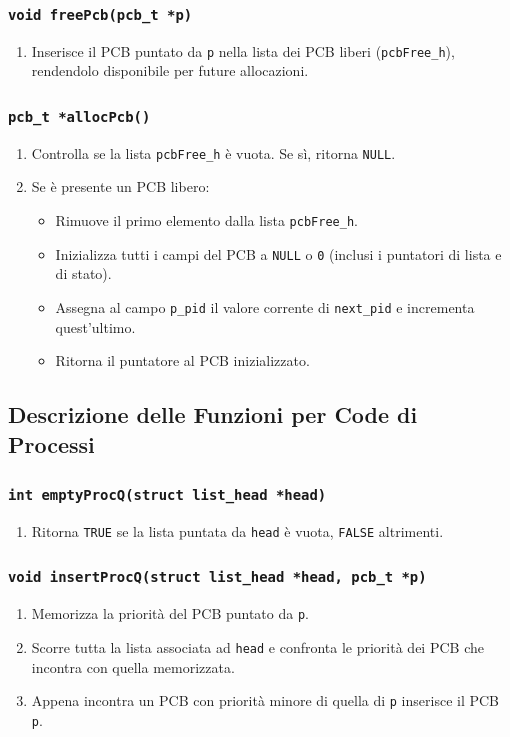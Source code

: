 \documentclass[a4paper,12pt]{article}
\begin{document}
\subsubsection{\texttt{void freePcb(pcb\_t *p)}}
\begin{enumerate}
    \item Inserisce il PCB puntato da \texttt{p} nella lista dei PCB liberi (\texttt{pcbFree\_h}), rendendolo disponibile per future allocazioni.
\end{enumerate}

\subsubsection{\texttt{pcb\_t *allocPcb()}}
\begin{enumerate}
    \item Controlla se la lista \texttt{pcbFree\_h} è vuota. Se sì, ritorna \texttt{NULL}.
    \item Se è presente un PCB libero:
    \begin{itemize}
        \item Rimuove il primo elemento dalla lista \texttt{pcbFree\_h}.
        \item Inizializza tutti i campi del PCB a \texttt{NULL} o \texttt{0} (inclusi i puntatori di lista e di stato).
        \item Assegna al campo \texttt{p\_pid} il valore corrente di \texttt{next\_pid} e incrementa quest'ultimo.
        \item Ritorna il puntatore al PCB inizializzato.
    \end{itemize}
\end{enumerate}

\vspace{0.5cm}
\subsection{Descrizione delle Funzioni per Code di Processi} %
\subsubsection{\texttt{int emptyProcQ(struct list\_head *head)}}
\begin{enumerate}
    \item Ritorna \texttt{TRUE} se la lista puntata da \texttt{head} è vuota, \texttt{FALSE} altrimenti.
\end{enumerate}

\subsubsection{\texttt{void insertProcQ(struct list\_head *head, pcb\_t *p)}}
\begin{enumerate}
    \item Memorizza la priorità del PCB puntato da \texttt{p}.
    \item Scorre tutta la lista associata ad \texttt{head} e confronta le priorità dei PCB che incontra con quella memorizzata.
    \item Appena incontra un PCB con priorità minore di quella di \texttt{p} inserisce il PCB \texttt{p}.
\end{enumerate}
\end{document}
